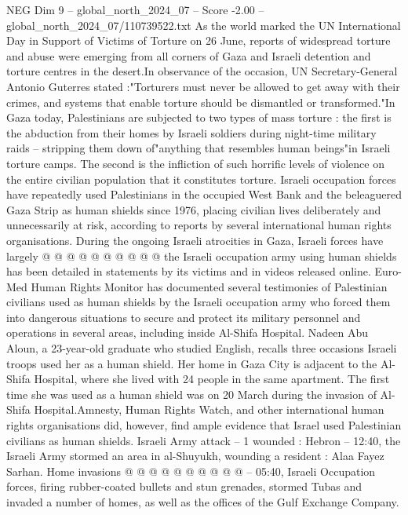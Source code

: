 \begin{textsample}{NEG Dim 9 – global\_north\_2024\_07 – Score -2.00 – global\_north\_2024\_07/110739522.txt}  \label{ex:f9_neg_142}
As the world marked the UN International Day in Support of Victims of Torture on 26 June, reports of widespread torture and abuse were emerging from all corners of Gaza and Israeli detention and torture centres in the desert.In observance of the occasion, UN Secretary-General Antonio Guterres stated :"Torturers must never be allowed to get away with their crimes, and systems that enable torture should be dismantled or transformed."In Gaza today, Palestinians are subjected to two types of mass torture : the first is the abduction from their homes by Israeli soldiers during night-time military raids -- stripping them down of"anything that resembles human beings"in Israeli torture camps.
The second is the infliction of such horrific levels of violence on the entire civilian population that it constitutes torture.
Israeli occupation forces have repeatedly used Palestinians in the occupied West Bank and the beleaguered Gaza Strip as human shields since 1976, placing civilian lives deliberately and unnecessarily at risk, according to reports by several international human rights organisations.
During the ongoing Israeli atrocities in Gaza, Israeli forces have largely @ @ @ @ @ @ @ @ @ @ the Israeli occupation army using human shields has been detailed in statements by its victims and in videos released online.
Euro-Med Human Rights Monitor has documented several testimonies of Palestinian civilians used as human shields by the Israeli occupation army who forced them into dangerous situations to secure and protect its military personnel and operations in several areas, including inside Al-Shifa Hospital.
Nadeen Abu Aloun, a 23-year-old graduate who studied English, recalls three occasions Israeli troops used her as a human shield.
Her home in Gaza City is adjacent to the Al-Shifa Hospital, where she lived with 24 people in the same apartment.
The first time she was used as a human shield was on 20 March during the invasion of Al-Shifa Hospital.Amnesty, Human Rights Watch, and other international human rights organisations did, however, find ample evidence that Israel used Palestinian civilians as human shields.
Israeli Army attack -- 1 wounded : Hebron -- 12:40, the Israeli Army stormed an area in al-Shuyukh, wounding a resident : Alaa Fayez Sarhan.
Home invasions @ @ @ @ @ @ @ @ @ @ -- 05:40, Israeli Occupation forces, firing rubber-coated bullets and stun grenades, stormed Tubas and invaded a number of homes, as well as the offices of the Gulf Exchange Company.

\end{textsample}
